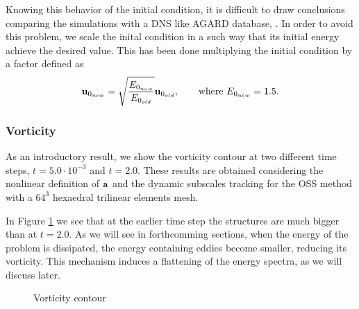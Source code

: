 Knowing this behavior of the initial condition, it is difficult to draw conclusions comparing the simulations with a DNS like AGARD database, \cite{_selection_????}. In order to avoid this problem, we scale the inital condition in a such way that its initial energy achieve the desired value. This has been done multiplying the initial condition by a factor defined as
$${\bf u}_{0_{new}}=\sqrt{\frac{E_{0_{new}}}{E_{0_{old}}}}{\bf u}_{0_{old}},\quad\quad\mbox{where $E_{0_{new}}=1.5$}.$$

\subsubsection{Vorticity}
As an introductory result, we show the vorticity contour at two different time steps, $t=5.0\cdot10^{-3}$ and $t=2.0$. These results are obtained considering the nonlinear definition of ${\bf a}$ and the dynamic subscales tracking for the OSS method with a $64^3$ hexaedral trilinear elements mesh. 

In Figure \ref{fig:vorti_contour} we see that at the earlier time step the structures are much bigger than at $ t=2.0 $. As we will see in forthcomming sections, when the energy of the problem is dissipated, the energy containing eddies become smaller, reducing its vorticity. This mechanism induces a flattening of the energy spectra, as we will discuss later.
\begin{figure}[h!]
  \centering
  \caption{Vorticity contour}
  \label{fig:vorti_contour}
\end{figure}

